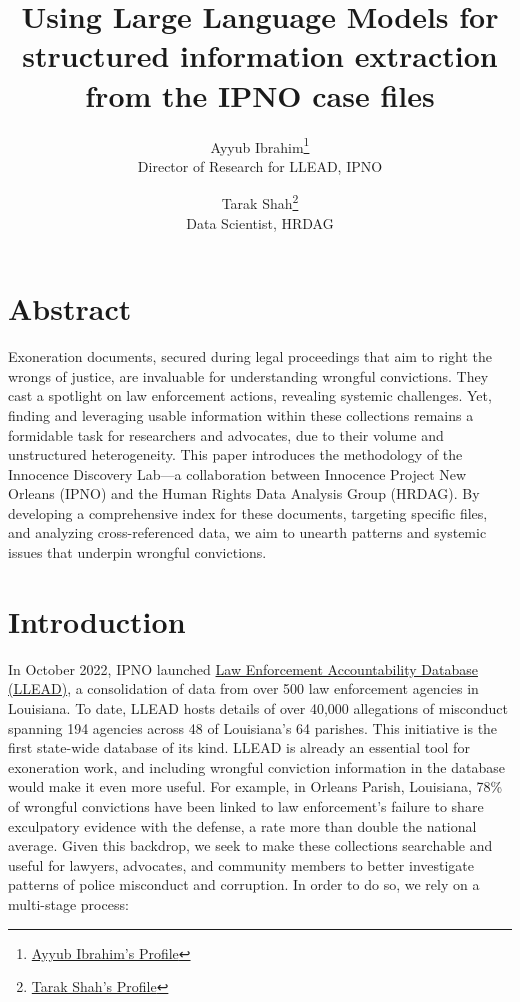 \documentclass{article}
\title{Using Large Language Models for structured information extraction from the IPNO case files}
\author{
    Ayyub Ibrahim\footnote{\href{https://ip-no.org/who-we-are/staff/}{Ayyub Ibrahim's Profile}} \\
    Director of Research for LLEAD, IPNO
    \and
    Tarak Shah\footnote{\href{https://hrdag.org/people/tarak-shah/}{Tarak Shah's Profile}} \\
    Data Scientist, HRDAG
}
\begin{document}
\maketitle

\section*{Abstract}
Exoneration documents, secured during legal proceedings that aim to right the wrongs of justice, are invaluable for understanding wrongful convictions. They cast a spotlight on law enforcement actions, revealing systemic challenges. Yet, finding and leveraging usable information within these collections remains a formidable task for researchers and advocates, due to their volume and unstructured heterogeneity. This paper introduces the methodology of the Innocence Discovery Lab—a collaboration between Innocence Project New Orleans (IPNO) and the Human Rights Data Analysis Group (HRDAG). By developing a comprehensive index for these documents, targeting specific files, and analyzing cross-referenced data, we aim to unearth patterns and systemic issues that underpin wrongful convictions.

\section{Introduction}

In October 2022, IPNO launched \href{https://llead.co/}{Law Enforcement Accountability Database (LLEAD)}, a consolidation of data from over 500 law enforcement agencies in Louisiana. To date, LLEAD hosts details of over 40,000 allegations of misconduct spanning 194 agencies across 48 of Louisiana's 64 parishes. This initiative is the first state-wide database of its kind. LLEAD is already an essential tool for exoneration work, and including wrongful conviction information in the database would make it even more useful. For example, in Orleans Parish, Louisiana, 78\% of wrongful convictions have been linked to law enforcement's failure to share exculpatory evidence with the defense, a rate more than double the national average. Given this backdrop, we seek to make these collections searchable and useful for lawyers, advocates, and community members to better investigate patterns of police misconduct and corruption. In order to do so, we rely on a multi-stage process:
\end{document}
